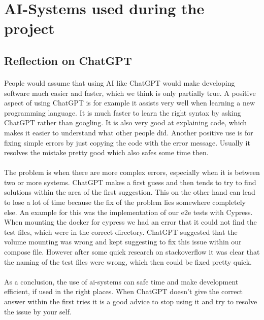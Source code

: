 \section{AI-Systems used during the project}
\subsection{Reflection on ChatGPT}
\paragraph{} People would assume that using AI like ChatGPT would make developing software much easier and faster, which we think is only partially true. 
A positive aspect of using ChatGPT is for example it assists very well when learning a new programming language. It is much faster to learn the right syntax by asking ChatGPT rather than googling. It is also very good at explaining code, which makes it easier to understand what other people did. Another positive use is for fixing simple errors by just copying the code with the error message. Usually it resolves the mistake pretty good which also safes some time then.\

\paragraph{} The problem is when there are more complex errors, especially when it is between two or more systems. ChatGPT makes a first guess and then tends to try to find solutions within the area of the first suggestion. This on the other hand can lead to lose a lot of time because the fix of the problem lies somewhere completely else. An example for this was the implementation of our e2e tests with Cypress. When mounting the docker for cypress we had an error that it could not find the test files, which were in the correct directory. ChatGPT suggested that the volume mounting was wrong and kept suggesting to fix this issue within our compose file. However after some quick research on stackoverflow it was clear that the naming of the test files were wrong, which then could be fixed pretty quick.

\paragraph{} As a conclusion, the use of ai-systems can safe time and make development efficient, if used in the right places. When ChatGPT doesn't give the correct answer within the first tries it is a good advice to stop using it and try to resolve the issue by your self. 